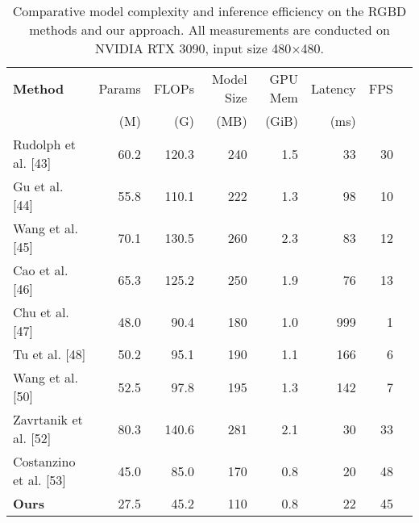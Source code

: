 \documentclass[a4paper,fleqnn]{cas-sc}
\begin{document}
\begin{table*}[ht]
\centering
\caption{\label{tab:complexity_rgbd} 
Comparative model complexity and inference efficiency on the RGBD methods and our approach. All measurements are conducted on NVIDIA RTX 3090, input size 480$\times$480.}
\begin{tabular}{l|r|r|r|r|r|r|r}
\hline
\textbf{Method} & Params & FLOPs & Model Size & GPU Mem & Latency & FPS \\
                & (M)    & (G)   & (MB)       & (GiB)   & (ms)    &      \\
\hline
Rudolph et al. [43]    & 60.2 & 120.3 & 240 & 1.5 & 33  & 30 \\
Gu et al. [44]         & 55.8 & 110.1 & 222 & 1.3 & 98 & 10 \\
Wang et al. [45]       & 70.1 & 130.5 & 260 & 2.3 & 83  & 12 \\
Cao et al. [46]        & 65.3 & 125.2 & 250 & 1.9 & 76  & 13 \\
Chu et al. [47]        & 48.0 &  90.4 & 180 & 1.0 & 999 & 1  \\
Tu et al. [48]         & 50.2 &  95.1 & 190 & 1.1 & 166 & 6  \\
Wang et al. [50]       & 52.5 &  97.8 & 195 & 1.3 & 142 & 7  \\
Zavrtanik et al. [52]  & 80.3 & 140.6 & 281 & 2.1 & 30  & 33 \\
Costanzino et al. [53] & 45.0 & 85.0 & 170 & 0.8 & 20  & 48 \\
\textbf{Ours}          & 27.5 &  45.2 & 110 & 0.8 & 22  & 45 \\
\hline
\end{tabular}
\end{table*}
\end{document}
